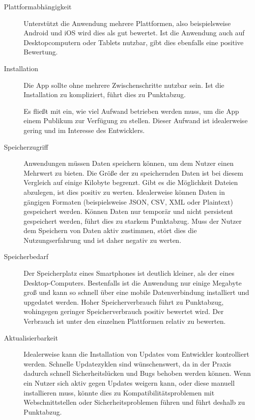 \begin{description}
	\item [Plattformabhängigkeit] 
		  Unterstützt die Anwendung mehrere Plattformen, also beispielsweise Android und iOS wird dies als gut bewertet. Ist die Anwendung auch auf Desktopcomputern oder Tablets nutzbar, gibt dies ebenfalls eine positive Bewertung.
		  
	\item [Installation]
	      Die App sollte ohne mehrere Zwischenschritte nutzbar sein. Ist die Installation zu kompliziert, führt dies zu Punktabzug.

	      Es fließt mit ein, wie viel Aufwand betrieben werden muss, um die App einem Publikum zur Verfügung zu stellen. Dieser Aufwand ist idealerweise gering und im Interesse des Entwicklers.

	\item [Speicherzugriff]
	      Anwendungen müssen Daten speichern können, um dem Nutzer einen Mehrwert zu bieten. Die Größe der zu speichernden Daten ist bei diesem Vergleich auf einige Kilobyte begrenzt. Gibt es die Möglichkeit Dateien abzulegen, ist dies positiv zu werten. Idealerweise können Daten in gängigen Formaten (beispielsweise JSON, CSV, XML oder Plaintext) gespeichert werden.
	      Können Daten nur temporär und nicht persistent gespeichert werden, führt dies zu starkem Punktabzug. Muss der Nutzer dem Speichern von Daten aktiv zustimmen, stört dies die Nutzungserfahrung und ist daher negativ zu werten.

	\item [Speicherbedarf]
	      Der Speicherplatz eines Smartphones ist deutlich kleiner, als der eines Desktop-Computers. Bestenfalls ist die Anwendung nur einige Megabyte groß und kann so schnell über eine mobile Datenverbindung installiert und upgedatet werden. \cite{AppleMaxAppSize} \cite{GoogleMaxAppSize}
	      Hoher Speicherverbrauch führt zu Punktabzug, wohingegen geringer Speicherverbrauch positiv bewertet wird. Der Verbrauch ist unter den einzelnen Plattformen relativ zu bewerten.

	\item [Aktualisierbarkeit]
	      Idealerweise kann die Installation von Updates vom Entwickler kontrolliert werden. Schnelle Updatezyklen sind wünschenswert, da in der Praxis dadurch schnell Sicherheitslücken und Bugs behoben werden können. Wenn ein Nutzer sich aktiv gegen Updates weigern kann, oder diese manuell installieren muss, könnte dies zu Kompatibilitätsproblemen mit Webschnittstellen oder Sicherheitsproblemen führen und führt deshalb zu Punktabzug.


\end{description}
